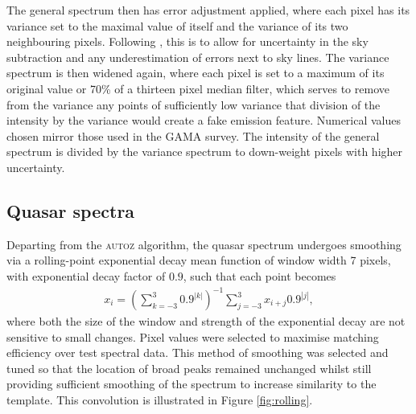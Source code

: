 \documentclass[5p]{elsarticle}
\newcommand{\autoz}{\textsc{autoz}}
\begin{document}
The general spectrum then has error adjustment applied, where each pixel has its variance set to the maximal value of itself and the variance of its two neighbouring pixels. Following \citet{baldry2014galaxy}, this is to allow for uncertainty in the sky subtraction and any underestimation of errors next to sky lines. The variance spectrum is then widened again, where each pixel is set to a maximum of its original value or 70\% of a thirteen pixel median filter, which serves to remove from the variance any points of sufficiently low variance that division of the intensity by the variance would create a fake emission feature. Numerical values chosen mirror those used in the GAMA survey. The intensity of the general spectrum is divided by the variance spectrum to down-weight pixels with higher uncertainty. 

\subsection{Quasar spectra}




Departing from the \autoz{} algorithm, the quasar spectrum undergoes smoothing via a rolling-point exponential decay mean function of window width 7 pixels, with exponential decay factor of $0.9$, such that each point becomes
\begin{align}
x_i = \left( \sum_{k = -3}^3 0.9^{|k|}   \right)^{-1} \sum_{j = -3}^3 x_{i+j} 0.9^{|j|},
\end{align}
where both the size of the window and strength of the exponential decay are not sensitive to small changes. Pixel values were selected to maximise matching efficiency over test spectral data. This method of smoothing was selected and tuned so that the location of broad peaks remained unchanged whilst still providing sufficient smoothing of the spectrum to increase similarity to the template. This convolution is illustrated in Figure \ref{fig:rolling}.
\end{document}
